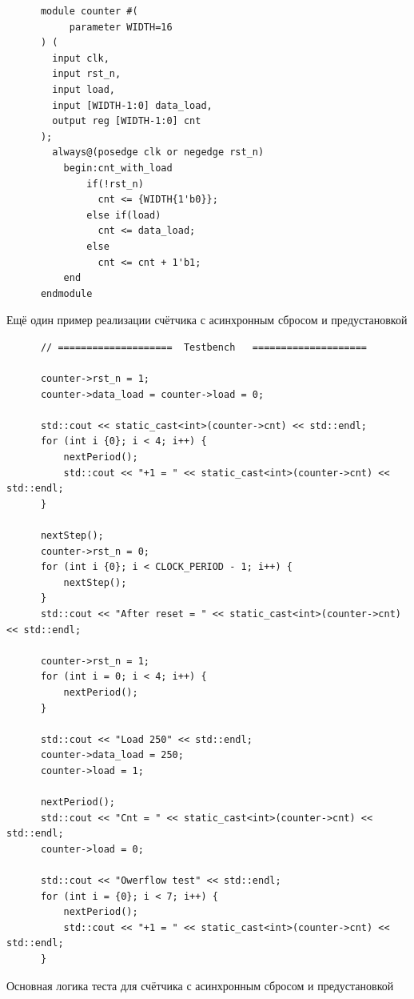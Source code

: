 \documentclass[a4paper]{article}
\begin{document}

  \begin{listing}[H]
    \begin{verbatim}
      module counter #(
           parameter WIDTH=16
      ) (
        input clk,
        input rst_n,
        input load,
        input [WIDTH-1:0] data_load,
        output reg [WIDTH-1:0] cnt
      );
        always@(posedge clk or negedge rst_n)
          begin:cnt_with_load
              if(!rst_n)
                cnt <= {WIDTH{1'b0}};
              else if(load)
                cnt <= data_load;
              else
                cnt <= cnt + 1'b1;
          end
      endmodule 
    \end{verbatim}
    \caption{Ещё один пример реализации счётчика с асинхронным сбросом и предустановкой}
  \end{listing}


  \begin{listing}[H]
    \begin{verbatim}
      // ====================  Testbench   ====================

      counter->rst_n = 1;
      counter->data_load = counter->load = 0;
  
      std::cout << static_cast<int>(counter->cnt) << std::endl;
      for (int i {0}; i < 4; i++) {
          nextPeriod();
          std::cout << "+1 = " << static_cast<int>(counter->cnt) << std::endl;
      }
  
      nextStep();
      counter->rst_n = 0;
      for (int i {0}; i < CLOCK_PERIOD - 1; i++) {
          nextStep();
      }
      std::cout << "After reset = " << static_cast<int>(counter->cnt) << std::endl;
  
      counter->rst_n = 1;
      for (int i = 0; i < 4; i++) {
          nextPeriod();
      }
  
      std::cout << "Load 250" << std::endl;
      counter->data_load = 250;
      counter->load = 1;
  
      nextPeriod();
      std::cout << "Cnt = " << static_cast<int>(counter->cnt) << std::endl;
      counter->load = 0;
  
      std::cout << "Owerflow test" << std::endl;
      for (int i = {0}; i < 7; i++) {
          nextPeriod();
          std::cout << "+1 = " << static_cast<int>(counter->cnt) << std::endl;
      }
    \end{verbatim}
    \caption{Основная логика теста для счётчика с асинхронным сбросом и предустановкой}
  \end{listing}
\end{document}
